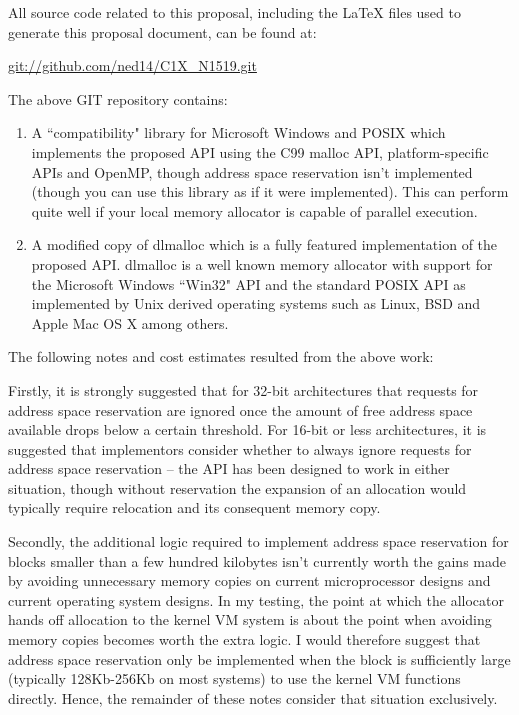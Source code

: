 \documentclass[wd]{isov2}
\begin{document}
{
All source code related to this proposal, including the LaTeX files used to generate this proposal document, can be found at:
\begin{center}
\url{git://github.com/ned14/C1X_N1519.git}
\end{center}
The above GIT repository contains:
\begin{enumerate}
\item A ``compatibility" library for Microsoft Windows and POSIX which implements the proposed API using the C99 malloc API, platform-specific APIs and OpenMP, though address space reservation isn't implemented (though you can use this library as if it were implemented). This can perform quite well if your local memory allocator is capable of parallel execution.
\item A modified copy of dlmalloc  which is a fully featured implementation of the proposed API. dlmalloc is a well known memory allocator with support for the Microsoft Windows ``Win32" API and the standard POSIX API as implemented by Unix derived operating systems such as Linux, BSD and Apple Mac OS X among others.
\end{enumerate}
The following notes and cost estimates resulted from the above work:

Firstly, it is strongly suggested that for 32-bit architectures that requests for address space reservation are ignored once the amount of free address space available drops below a certain threshold. For 16-bit or less architectures, it is suggested that implementors consider whether to always ignore requests for address space reservation -- the API has been designed to work in either situation, though without reservation the expansion of an allocation would typically require relocation and its consequent memory copy.

Secondly, the additional logic required to implement address space reservation for blocks smaller than a few hundred kilobytes isn't currently worth the gains made by avoiding unnecessary memory copies on current microprocessor designs and current operating system designs. In my testing, the point at which the allocator hands off allocation to the kernel VM system is about the point when avoiding memory copies becomes worth the extra logic. I would therefore suggest that address space reservation only be implemented when the block is sufficiently large (typically 128Kb-256Kb on most systems) to use the kernel VM functions directly. Hence, the remainder of these notes consider that situation exclusively.

}
\end{document}
